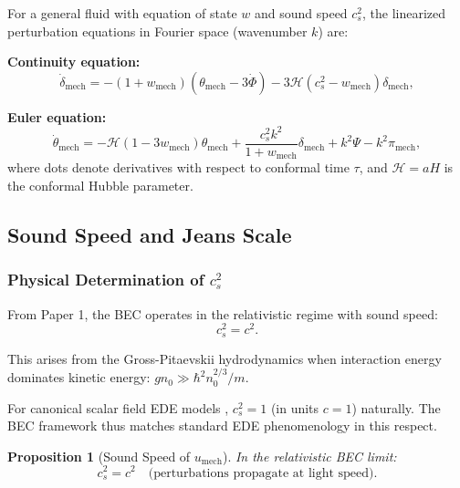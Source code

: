 \documentclass[11pt,a4paper]{article}
\newcommand{\umech}{\ensuremath{u_{\mathrm{mech}}}}
\newcommand{\wmech}{\ensuremath{w_{\mathrm{mech}}}}
\newtheorem{proposition}[theorem]{Proposition}
\theoremstyle{definition}
\theoremstyle{remark}
\begin{document}
For a general fluid with equation of state $w$ and sound speed $c_s^2$, the linearized perturbation equations in Fourier space (wavenumber $k$) are:

\textbf{Continuity equation:}
\begin{equation}
\label{eq:delta_evolution}
\boxed{\dot{\delta}_{\mathrm{mech}} = -(1+\wmech)(\theta_{\mathrm{mech}} - 3\dot{\Phi}) - 3\mathcal{H}(c_s^2 - \wmech)\delta_{\mathrm{mech}},}
\end{equation}

\textbf{Euler equation:}
\begin{equation}
\label{eq:theta_evolution}
\boxed{\dot{\theta}_{\mathrm{mech}} = -\mathcal{H}(1-3\wmech)\theta_{\mathrm{mech}} + \frac{c_s^2 k^2}{1+\wmech}\delta_{\mathrm{mech}} + k^2\Psi - k^2\pi_{\mathrm{mech}},}
\end{equation}
where dots denote derivatives with respect to conformal time $\tau$, and $\mathcal{H} = aH$ is the conformal Hubble parameter.

\subsection{Sound Speed and Jeans Scale}
\label{sec:cs_jeans}

\subsubsection{Physical Determination of $c_s^2$}

From Paper 1, the BEC operates in the relativistic regime with sound speed:
\begin{equation}
c_s^2 = c^2.
\end{equation}

This arises from the Gross-Pitaevskii hydrodynamics when interaction energy dominates kinetic energy: $gn_0 \gg \hbar^2 n_0^{2/3}/m$.

For canonical scalar field EDE models \cite{Poulin2019}, $c_s^2 = 1$ (in units $c=1$) naturally. The BEC framework thus matches standard EDE phenomenology in this respect.

\begin{proposition}[Sound Speed of $\umech$]
\label{prop:cs_mech}
In the relativistic BEC limit:
\begin{equation}
\boxed{c_s^2 = c^2 \quad \text{(perturbations propagate at light speed)}.}
\end{equation}
\end{proposition}
\end{document}
